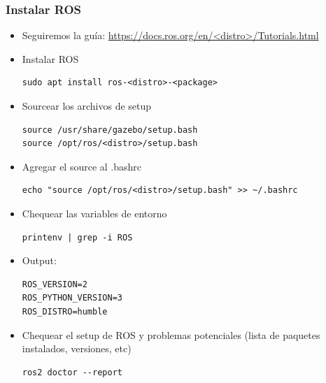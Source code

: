 \begin{frame}[fragile]
	\frametitle{Instalar ROS}
    \scriptsize
    \begin{itemize}
        \item Seguiremos la guía: \href{https://docs.ros.org/en/<distro>/Tutorials.html}{https://docs.ros.org/en/<distro>/Tutorials.html}
        \item Instalar ROS
        \begin{lstlisting}[style=bash]
sudo apt install ros-<distro>-<package>
        \end{lstlisting}

        \item Sourcear los archivos de setup
        \begin{lstlisting}[style=bash]source /usr/share/gazebo/setup.bash
source /opt/ros/<distro>/setup.bash
        \end{lstlisting}

        \item Agregar el source al .bashrc
        \begin{lstlisting}[style=bash]
echo "source /opt/ros/<distro>/setup.bash" >> ~/.bashrc
        \end{lstlisting}

        \item Chequear las variables de entorno
        \begin{lstlisting}[style=bash]
printenv | grep -i ROS
        \end{lstlisting}

        \item Output:
        \begin{lstlisting}[style=bash]
ROS_VERSION=2
ROS_PYTHON_VERSION=3
ROS_DISTRO=humble
        \end{lstlisting}	
        
        \item Chequear el setup de ROS y problemas potenciales (lista de paquetes instalados, versiones, etc)
        
        \begin{lstlisting}[style=bash]
ros2 doctor --report
        \end{lstlisting}
    \end{itemize}
\end{frame}

